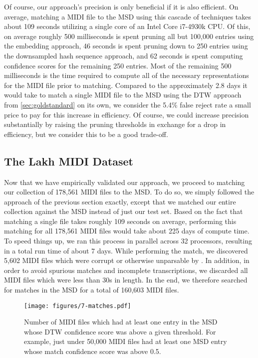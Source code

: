 Of course, our approach's precision is only beneficial if it is also efficient.
On average, matching a MIDI file to the MSD using this cascade of techniques takes about 109 seconds utilizing a single core of an Intel Core i7-4930k CPU.
Of this, on average roughly 500 milliseconds is spent pruning all but 100,000 entries using the embedding approach, 46 seconds is spent pruning down to 250 entries using the downsampled hash sequence approach, and 62 seconds is spent computing confidence scores for the remaining 250 entries.
Most of the remaining 500 milliseconds is the time required to compute all of the necessary representations for the MIDI file prior to matching.
Compared to the approximately 2.8 days it would take to match a single MIDI file to the MSD using the DTW approach from \cref{sec:goldstandard} on its own, we consider the 5.4\% false reject rate a small price to pay for this increase in efficiency.
Of course, we could increase precision substantially by raising the pruning thresholds in exchange for a drop in efficiency, but we consider this to be a good trade-off.

\subsection{The Lakh MIDI Dataset}

Now that we have empirically validated our approach, we proceed to matching our collection of 178,561 MIDI files to the MSD.
To do so, we simply followed the approach of the previous section exactly, except that we matched our entire collection against the MSD instead of just our test set.
Based on the fact that matching a single file takes roughly 109 seconds on average, performing this matching for all 178,561 MIDI files would take about 225 days of compute time.
To speed things up, we ran this process in parallel across 32 processors, resulting in a total run time of about 7 days.
While performing the match, we discovered 5,602 MIDI files which were corrupt or otherwise unparsable by \prettymidi{}.
In addition, in order to avoid spurious matches and incomplete transcriptions, we discarded all MIDI files which were less than 30s in length.
In the end, we therefore searched for matches in the MSD for a total of 160,603 MIDI files.

\begin{figure}
  \texttt{[image: figures/7-matches.pdf]}
  \caption[Number of MIDI files with matches above a given confidence]{Number of MIDI files which had at least one entry in the MSD whose DTW confidence score was above a given threshold.
 For example, just under 50,000 MIDI files had at least one MSD entry whose match confidence score was above 0.5.}
  \label{fig:match_confidences}
\end{figure}

